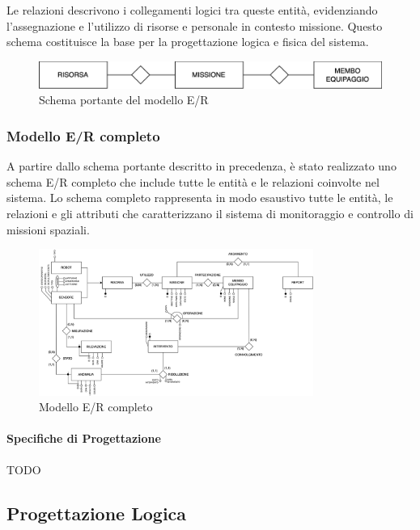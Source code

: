 Le relazioni descrivono i collegamenti logici tra queste entità, evidenziando l'assegnazione e l'utilizzo di risorse e personale in contesto missione. Questo schema costituisce la base per la progettazione logica e fisica del sistema.

\begin{figure}[h!]
    \centering
    \includegraphics[width=1\textwidth]{Media/schema_portante.png}
    \caption{Schema portante del modello E/R}
    \label{fig:schema_portante}
\end{figure}


\subsubsection{Modello E/R completo}

A partire dallo schema portante descritto in precedenza, è stato realizzato uno schema E/R completo che include tutte le entità e le relazioni coinvolte nel sistema. Lo schema completo rappresenta in modo esaustivo tutte le entità, le relazioni e gli attributi che caratterizzano il sistema di monitoraggio e controllo di missioni spaziali.

\begin{figure}[h!]
    \centering
    \includegraphics[width=0.8\textwidth]{Media/ER_Completo.png}
    \caption{Modello E/R completo}
    \label{fig:schema_portante}
\end{figure}

\paragraph{Specifiche di Progettazione}

TODO

\subsection{Progettazione Logica}

